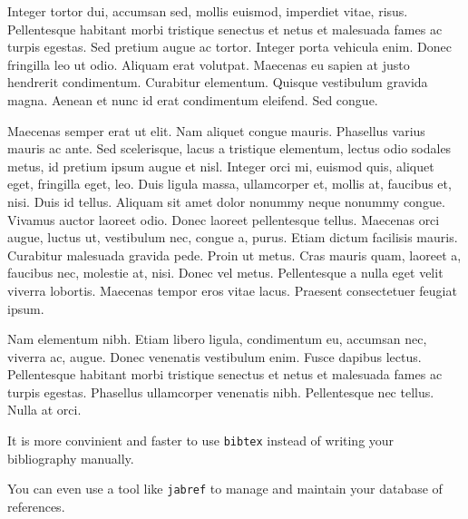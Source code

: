 \documentclass{icldt}
\begin{document}
Integer tortor dui, accumsan sed, mollis euismod, imperdiet vitae, risus.
Pellentesque habitant morbi tristique senectus et netus et malesuada fames ac
turpis egestas. Sed pretium augue ac tortor. Integer porta vehicula enim. Donec
fringilla leo ut odio. Aliquam erat volutpat. Maecenas eu sapien at justo
hendrerit condimentum. Curabitur elementum. Quisque vestibulum gravida magna.
Aenean et nunc id erat condimentum eleifend. Sed congue.

Maecenas semper erat ut elit. Nam aliquet congue mauris. Phasellus varius mauris
ac ante. Sed scelerisque, lacus a tristique elementum, lectus odio sodales
metus, id pretium ipsum augue et nisl. Integer orci mi, euismod quis, aliquet
eget, fringilla eget, leo. Duis ligula massa, ullamcorper et, mollis at,
faucibus et, nisi. Duis id tellus. Aliquam sit amet dolor nonummy neque nonummy
congue. Vivamus auctor laoreet odio. Donec laoreet pellentesque tellus. Maecenas
orci augue, luctus ut, vestibulum nec, congue a, purus. Etiam dictum facilisis
mauris. Curabitur malesuada gravida pede. Proin ut metus. Cras mauris quam,
laoreet a, faucibus nec, molestie at, nisi. Donec vel metus. Pellentesque a
nulla eget velit viverra lobortis. Maecenas tempor eros vitae lacus. Praesent
consectetuer feugiat ipsum.

Nam elementum nibh. Etiam libero ligula, condimentum eu, accumsan nec, viverra
ac, augue. Donec venenatis vestibulum enim. Fusce dapibus lectus. Pellentesque
habitant morbi tristique senectus et netus et malesuada fames ac turpis egestas.
Phasellus ullamcorper venenatis nibh. Pellentesque nec tellus. Nulla at orci.


\begin{thebibliography}{123}
\raggedright

 It is more convinient and faster to use \texttt{bibtex} instead 
of writing your bibliography manually.

You can even use a tool like \texttt{jabref} to manage and maintain your 
database of references.

\end{thebibliography}
\end{document}
